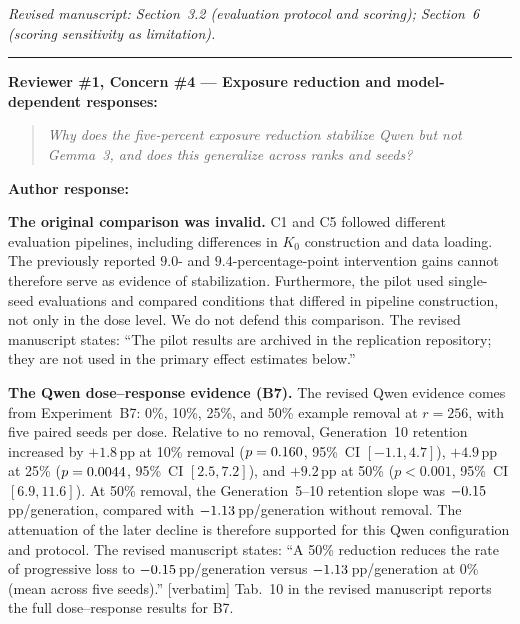 \documentclass[11pt,a4paper]{article}
\newcommand{\rconcern}[3]{%
  \bigskip\noindent\rule{\linewidth}{0.4pt}\par\medskip
  \noindent\textbf{\textcolor{rccolor}{#1 --- #2:}}\par
  \smallskip
  \begin{quote}\itshape\textcolor{rccolor}{#3}\end{quote}%
}
\newcommand{\arhead}[1]{\medskip\noindent\textbf{#1}\par\smallskip}
\newcommand{\newtext}[1]{\textcolor{chgcolor}{``#1''}}
\newcommand{\msloc}[1]{%
  \smallskip\noindent\textit{Revised manuscript: #1}\par%
}
\begin{document}
\msloc{Section~3.2 (evaluation protocol and scoring); Section~6
(scoring sensitivity as limitation).}

\rconcern{Reviewer \#1, Concern \#4}{Exposure reduction and model-dependent responses}{Why does the five-percent exposure reduction stabilize Qwen but not Gemma~3, and does this generalize across ranks and seeds?}

\arhead{Author response:}

\textbf{The original comparison was invalid.}
C1 and C5 followed different evaluation pipelines, including differences in $K_0$ construction and data loading. The previously reported $9.0$- and $9.4$-percentage-point intervention gains cannot therefore serve as evidence of stabilization. Furthermore, the pilot used single-seed evaluations and compared conditions that differed in pipeline construction, not only in the dose level. We do not defend this comparison. The revised manuscript states: \newtext{The pilot results are archived in the replication repository; they are not used in the primary effect estimates below.}

\medskip\noindent\textbf{The Qwen dose--response evidence (B7).} The revised Qwen evidence comes from Experiment~B7: 0\%, 10\%, 25\%, and 50\% example removal at $r=256$, with five paired seeds per dose. Relative to no removal, Generation~10 retention increased by $+1.8$\,pp at 10\% removal ($p=0.160$, 95\%~CI $[-1.1,4.7]$), $+4.9$\,pp at 25\% ($p=0.0044$, 95\%~CI $[2.5,7.2]$), and $+9.2$\,pp at 50\% ($p{<}0.001$, 95\%~CI $[6.9,11.6]$). At 50\% removal, the Generation~5--10 retention slope was $-0.15$\,pp/generation, compared with $-1.13$\,pp/generation without removal. The attenuation of the later decline is therefore supported for this Qwen configuration and protocol. The revised manuscript states: \newtext{A 50\% reduction reduces the rate of progressive loss to $-0.15$\,pp/generation versus $-1.13$\,pp/generation at 0\% (mean across five seeds).} [verbatim]
Tab.~10 in the revised manuscript reports the full dose--response results for B7.
\end{document}
